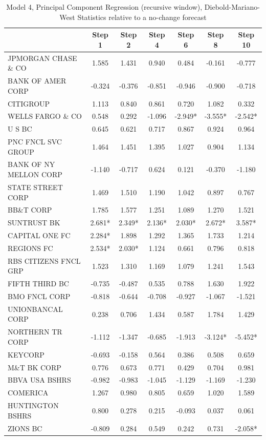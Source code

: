 \documentclass[11pt]{article}
\begin{document}
\begin{table}
\caption{Model 4, Principal Component Regression (recursive window), Diebold-Mariano-West Statistics relative to a no-change forecast}                                                       
\center                                                             
\begin{tabular}{|l|c|c|c|c|c|c|}                                    
\hline                                                              
&Step 1 &Step 2 &Step 4 &Step 6 &Step 8 &Step 10\\                  
\hline                                                              
JPMORGAN CHASE \& CO  &1.585&1.431&0.940&0.484&-0.161&-0.777\\      
BANK OF AMER CORP     &-0.324&-0.376&-0.851&-0.946&-0.900&-0.718\\  
CITIGROUP             &1.113&0.840&0.861&0.720&1.082&0.332\\        
WELLS FARGO \& CO     &0.548&0.292&-1.096&-2.949*&-3.555*&-2.542*\\ 
U S BC                &0.645&0.621&0.717&0.867&0.924&0.964\\        
PNC FNCL SVC GROUP    &1.464&1.451&1.395&1.027&0.904&1.134\\        
BANK OF NY MELLON CORP&-1.140&-0.717&0.624&0.121&-0.370&-1.180\\    
STATE STREET CORP     &1.469&1.510&1.190&1.042&0.897&0.767\\        
BB\&T CORP            &1.785&1.577&1.251&1.089&1.270&1.521\\        
SUNTRUST BK           &2.681*&2.349*&2.136*&2.030*&2.672*&3.587*\\  
CAPITAL ONE FC        &2.284*&1.898&1.292&1.365&1.733&1.214\\       
REGIONS FC            &2.534*&2.030*&1.124&0.661&0.796&0.818\\      
RBS CITIZENS FNCL GRP &1.523&1.310&1.169&1.079&1.241&1.543\\        
FIFTH THIRD BC        &-0.735&-0.487&0.535&0.788&1.630&1.922\\      
BMO FNCL CORP         &-0.818&-0.644&-0.708&-0.927&-1.067&-1.521\\  
UNIONBANCAL CORP      &0.238&0.706&1.434&0.587&1.784&1.429\\        
NORTHERN TR CORP      &-1.112&-1.347&-0.685&-1.913&-3.124*&-5.452*\\
KEYCORP               &-0.693&-0.158&0.564&0.386&0.508&0.659\\      
M\&T BK CORP          &0.776&0.673&0.771&0.429&0.704&0.981\\        
BBVA USA BSHRS        &-0.982&-0.983&-1.045&-1.129&-1.169&-1.230\\  
COMERICA              &1.267&0.980&0.805&0.659&1.020&1.589\\        
HUNTINGTON BSHRS      &0.800&0.278&0.215&-0.093&0.037&0.061\\       
ZIONS BC              &-0.809&0.284&0.549&0.242&0.731&-2.058*\\     
\hline                                                              
\end{tabular}


\end{table}
\end{document}
